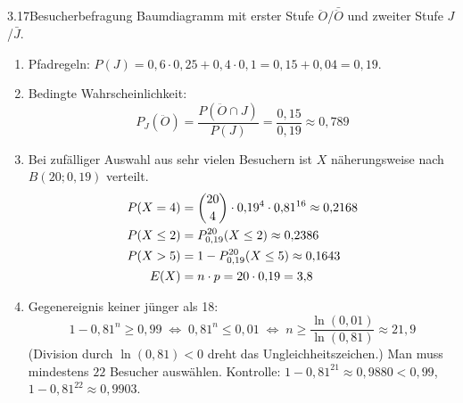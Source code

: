 \begin{loesung}{3.17}{Besucherbefragung}
Baumdiagramm mit erster Stufe $\ddot{O}$/$\bar{\ddot{O}}$ und zweiter Stufe $J$/$\bar{J}$.
\begin{enumerate}[label=\alph*)]
  \item Pfadregeln: $P(J) = 0{,}6\cdot 0{,}25+0{,}4\cdot 0{,}1 = 0{,}15+0{,}04 = 0{,}19$.
  \item Bedingte Wahrscheinlichkeit:
  \[P_J(\ddot{O}) = \dfrac{P(\ddot{O}\cap J)}{P(J)} = \dfrac{0{,}15}{0{,}19}\approx 0{,}789\]
  \item Bei zufälliger Auswahl aus sehr vielen Besuchern ist $X$ näherungsweise nach $B(20;0{,}19)$ verteilt.
  \begin{align*}
    P(X=4) &= \dbinom{20}{4}\cdot 0{,}19^4\cdot 0{,}81^{16}\approx 0{,}2168\\
    P(X\leq 2) &= P^{20}_{0{,}19}(X\leq 2)\approx 0{,}2386\\
    P(X>5) &= 1-P^{20}_{0{,}19}(X\leq 5)\approx 0{,}1643\\
    E(X) &= n\cdot p = 20\cdot 0{,}19 = 3{,}8
  \end{align*}
  \item Gegenereignis \glqq keiner jünger als 18\grqq:
  \[1-0{,}81^n\geq 0{,}99\;\Longleftrightarrow\;0{,}81^n\leq 0{,}01\;\Longleftrightarrow\;n\geq\dfrac{\ln{(0{,}01)}}{\ln{(0{,}81)}}\approx 21{,}9\]
  (Division durch $\ln{(0{,}81)}<0$ dreht das Ungleichheitszeichen.) Man muss mindestens $22$ Besucher auswählen. Kontrolle: $1-0{,}81^{21}\approx 0{,}9880<0{,}99$, $1-0{,}81^{22}\approx 0{,}9903$.
\end{enumerate}
\end{loesung}

